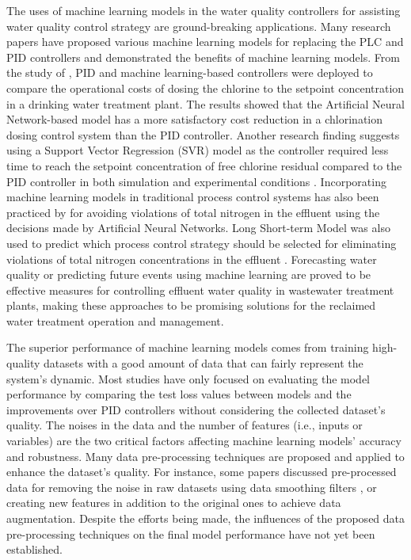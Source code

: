 The uses of machine learning models in the water quality controllers for assisting water quality control strategy are ground-breaking applications. Many research papers have proposed various machine learning models for replacing the PLC and PID controllers and demonstrated the benefits of machine learning models. From the study of \citep{librantzArtificialNeuralNetworks2018}, PID and machine learning-based controllers were deployed to compare the operational costs of dosing the chlorine to the setpoint concentration in a drinking water treatment plant. The results showed that the Artificial Neural Network-based model has a more satisfactory cost reduction in a chlorination dosing control system than the PID controller. Another research finding suggests using a Support Vector Regression (SVR) model as the controller required less time to reach the setpoint concentration of free chlorine residual compared to the PID controller in both simulation and experimental conditions \citet{wangModelPredictiveControl2020}. Incorporating machine learning models in traditional process control systems has also been practiced by \citet{santinFuzzyControlModel2015} for avoiding violations of total nitrogen in the effluent using the decisions made by Artificial Neural Networks. Long Short-term Model was also used to predict which process control strategy should be selected for eliminating violations of total nitrogen concentrations in the effluent \cite{pisaLSTMBasedWastewaterTreatment2019}. Forecasting water quality or predicting future events using machine learning are proved to be effective measures for controlling effluent water quality in wastewater treatment plants, making these approaches to be promising solutions for the reclaimed water treatment operation and management.

The superior performance of machine learning models comes from training high-quality datasets with a good amount of data that can fairly represent the system's dynamic. Most studies have only focused on evaluating the model performance by comparing the test loss values between models and the improvements over PID controllers without considering the collected dataset's quality. The noises in the data and the number of features (i.e., inputs or variables) are the two critical factors affecting machine learning models' accuracy and robustness. Many data pre-processing techniques are proposed and applied to enhance the dataset's quality. For instance, some papers discussed pre-processed data for removing the noise in raw datasets using data smoothing filters \citep{chengForecastingWastewaterTreatment2020}, or creating new features in addition to the original ones \citep{mamandipoorMonitoringDetectingFaults2020} to achieve data augmentation. Despite the efforts being made, the influences of the proposed data pre-processing techniques on the final model performance have not yet been established.

